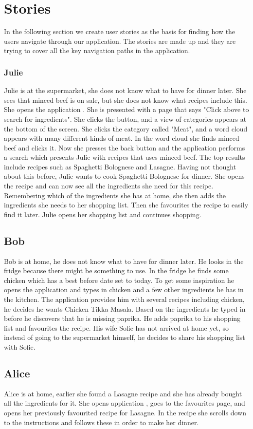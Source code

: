 \section{Stories}
In the following section we create user stories as the basis for finding how the users navigate through our application. The stories are made up and they are trying to cover all the key navigation paths in the application.

\subsubsection*{Julie}

Julie is at the supermarket, she does not know what to have for dinner later. She sees that minced beef is on sale, but she does not know what recipes include this. She opens the application \appname. She is presented with a page that says "Click above to search for ingredients". She clicks the button, and a view of categories appears at the bottom of the screen. She clicks the category called "Meat", and a word cloud appears with many different kinds of meat. In the word cloud she finds minced beef and clicks it. Now she presses the back button and the application performs a search which presents Julie with recipes that uses minced beef. The top results include recipes such as Spaghetti Bolognese and Lasagne. Having not thought about this before, Julie wants to cook Spaghetti Bolognese for dinner. She opens the recipe and can now see all the ingredients she need for this recipe. Remembering which of the ingredients she has at home, she then adds the ingredients she needs to her shopping list. Then she favourites the recipe to easily find it later. Julie opens her shopping list and continues shopping.

\subsection*{Bob}
Bob is at home, he does not know what to have for dinner later. He looks in the fridge because there might be something to use. In the fridge he finds some chicken which has a best before date set to today. To get some inspiration he opens the application and types in chicken and a few other ingredients he has in the kitchen. The application provides him with several recipes including chicken, he decides he wants Chicken Tikka Masala. Based on the ingredients he typed in before he discovers that he is missing paprika. He adds paprika to his shopping list and favourites the recipe. His wife Sofie has not arrived at home yet, so instead of going to the supermarket himself, he decides to share his shopping list with Sofie.

\subsection*{Alice}
Alice is at home, earlier she found a Lasagne recipe and she has already bought all the ingredients for it. She opens application \appname, goes to the favourites page, and opens her previously favourited recipe for Lasagne. In the recipe she scrolls down to the instructions and follows these in order to make her dinner.
